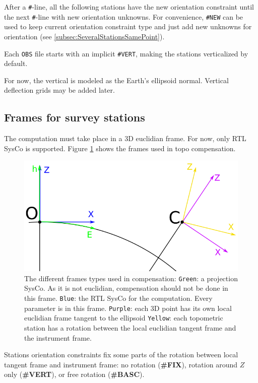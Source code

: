 After a \texttt{\#}-line, all the following stations have the new orientation constraint until the next \texttt{\#}-line with new orientation unknowns.
For convenience, \texttt{\#NEW} can be used to keep current orientation constraint type and just add new unknowns for orientation (see \ref{subsec:SeveralStationsSamePoint}).


Each \texttt{OBS} file starts with an implicit \texttt{\#VERT}, making the stations verticalized by default.

For now, the vertical is modeled as the Earth's ellipsoid normal. Vertical deflection grids may be added later.



\subsection{Frames for survey stations}

The computation must take place in a 3D euclidian frame. For now, only RTL SysCo is supported.
Figure \ref{fig:topoFrames} shows the frames used in topo compensation.

\begin{figure}[!h]
\centering
\includegraphics[width=12cm]{Programmer/framesTopo.png}
\caption{The different frames types used in compensation:
   \texttt{Green}: a projection SysCo. As it is not euclidian, compensation should not be done in this frame.
   \texttt{Blue}: the RTL SysCo for the computation. Every parameter is in this frame.
   \texttt{Purple}: each 3D point has its own local euclidian frame tangent to the ellipsoid
   \texttt{Yellow}: each topometric station has a rotation between the local euclidian tangent frame and the instrument frame.
 }
\label{fig:topoFrames}
\end{figure}


Stations orientation constraints fix some parts of the rotation between local tangent frame and instrument frame:
no rotation (\textbf{\#FIX}), rotation around $Z$ only (\textbf{\#VERT}), or free rotation (\textbf{\#BASC}).



